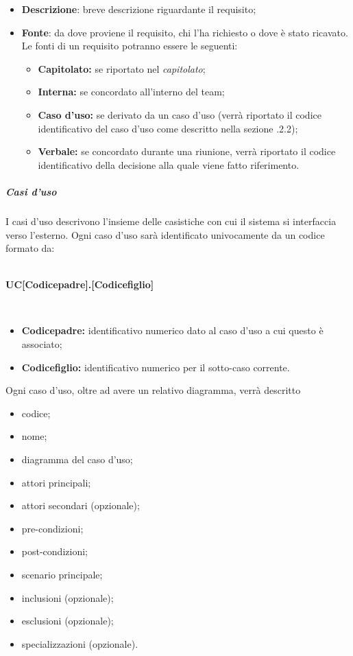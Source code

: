 \begin{itemize}
  \item \textbf{Descrizione}: breve descrizione riguardante il requisito;
  \item \textbf{Fonte}: da dove proviene il requisito, chi l'ha richiesto o dove è stato ricavato. Le fonti di un requisito potranno essere le seguenti:
  \begin{itemize}
  	\item \textbf{Capitolato\glos:} se riportato nel \textit{capitolato\glos};
  	\item \textbf{Interna:} se concordato all'interno del team;
  	\item \textbf{Caso d'uso:} se derivato da un caso d'uso (verrà riportato il codice identificativo del caso d'uso come descritto nella sezione .2.2);
  	\item \textbf{Verbale:} se concordato durante una riunione, verrà riportato il codice identificativo della decisione alla quale viene fatto riferimento.
  \end{itemize}
\end{itemize}

\subparagraph*{Casi d'uso}
I casi d'uso descrivono l'insieme delle casistiche con cui il sistema si interfaccia verso l'esterno. Ogni caso d'uso sarà identificato univocamente da un codice formato da:
\\\\
\centerline{\textbf{UC[Codicepadre].[Codicefiglio]}}\\

\begin{itemize}
	\item \textbf{Codicepadre:} identificativo numerico dato al caso d'uso a cui questo è associato;
	\item \textbf{Codicefiglio:} identificativo numerico per il sotto-caso corrente.
\end{itemize}
Ogni caso d'uso, oltre ad avere un relativo diagramma, verrà descritto
\begin{itemize}
  \item codice;
  \item nome;
  \item diagramma del caso d'uso;
  \item attori principali;
  \item attori secondari (opzionale);
  \item pre-condizioni;
  \item post-condizioni;
  \item scenario principale;
  \item inclusioni (opzionale);
  \item esclusioni (opzionale);
  \item specializzazioni (opzionale).
\end{itemize}

